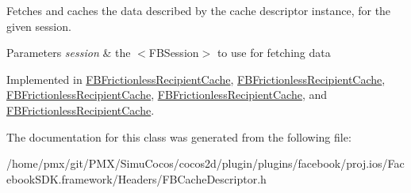 Fetches and caches the data described by the cache descriptor instance, for the given session.


\begin{DoxyParams}{Parameters}
{\em session} & the $<$\+F\+B\+Session$>$ to use for fetching data \\
\hline
\end{DoxyParams}


Implemented in \hyperlink{interfaceFBFrictionlessRecipientCache_a4f218828f2b6a8bb5a8e0044e98689dc}{F\+B\+Frictionless\+Recipient\+Cache}, \hyperlink{interfaceFBFrictionlessRecipientCache_a4f218828f2b6a8bb5a8e0044e98689dc}{F\+B\+Frictionless\+Recipient\+Cache}, \hyperlink{interfaceFBFrictionlessRecipientCache_a4f218828f2b6a8bb5a8e0044e98689dc}{F\+B\+Frictionless\+Recipient\+Cache}, \hyperlink{interfaceFBFrictionlessRecipientCache_a4f218828f2b6a8bb5a8e0044e98689dc}{F\+B\+Frictionless\+Recipient\+Cache}, and \hyperlink{interfaceFBFrictionlessRecipientCache_a4f218828f2b6a8bb5a8e0044e98689dc}{F\+B\+Frictionless\+Recipient\+Cache}.



The documentation for this class was generated from the following file\+:\begin{DoxyCompactItemize}
\item 
/home/pmx/git/\+P\+M\+X/\+Simu\+Cocos/cocos2d/plugin/plugins/facebook/proj.\+ios/\+Facebook\+S\+D\+K.\+framework/\+Headers/F\+B\+Cache\+Descriptor.\+h\end{DoxyCompactItemize}
